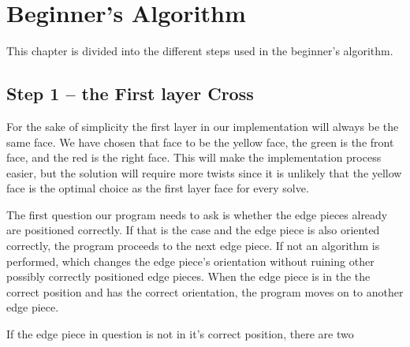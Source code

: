 \chapter{Beginner's Algorithm}
This chapter is divided into the different steps used in the beginner's algorithm.
\section{Step 1 -- the First layer Cross}
For the sake of simplicity the first layer in our implementation will always be the same face. We have chosen that face to be the yellow face, the green is the front face, and the red is the right face. This will make the implementation process easier, but the solution will require more twists since it is unlikely that the yellow face is the optimal choice as the first layer face for every solve.

The first question our program needs to ask is whether the edge pieces already are positioned correctly. If that is the case and the edge piece is also oriented correctly, the program proceeds to the next edge piece. If not an algorithm is performed, which changes the edge piece's orientation without ruining other possibly correctly positioned edge pieces. When the edge piece is in the the correct position and has the correct orientation, the program moves on to another edge piece. 

If the edge piece in question is not in it's correct position, there are two 